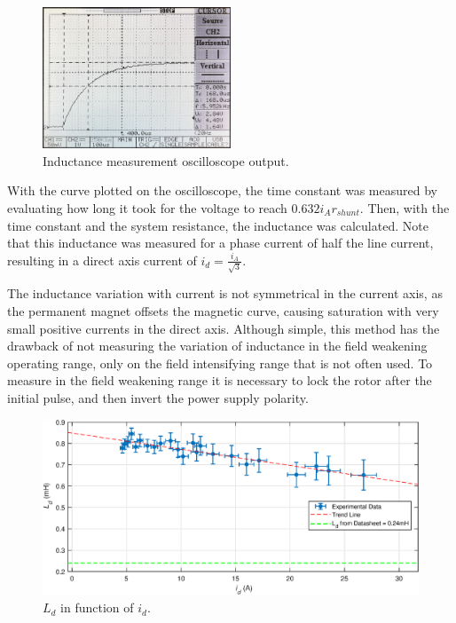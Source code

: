 \begin{figure}[!htb]
	\centering
	\includegraphics[width=0.5\textwidth]{Figures/induc_oscilloscope.JPEG}
	\caption[Inductance measurement oscilloscope output.]{Inductance measurement oscilloscope output.}
	\label{fig:inductance_oscilloscope} %
\end{figure}

With the curve plotted on the oscilloscope, the time constant was measured by evaluating how long it took for the voltage to reach $0.632 i_A r_{shunt}$. Then, with the time constant and the system resistance, the inductance was calculated. Note that this inductance was measured for a phase current of half the line current, resulting in a direct axis current of $i_d = \frac{i_A}{\sqrt{3}}$.

The inductance variation with current is not symmetrical in the current axis, as the permanent magnet offsets the magnetic curve, causing saturation with very small positive currents in the direct axis. Although simple, this method has the drawback of not measuring the variation of inductance in the field weakening operating range, only on the field intensifying range that is not often used. To measure in the field weakening range it is necessary to lock the rotor after the initial pulse, and then invert the power supply polarity.

\begin{figure}[!htb]
	\centering
	\includegraphics[width=1\textwidth]{Figures/Ld_id.eps}
	\caption[$L_d$ in function of $i_d$.]{$L_d$ in function of $i_d$.}
	\label{fig:ld_graph} %
\end{figure}

